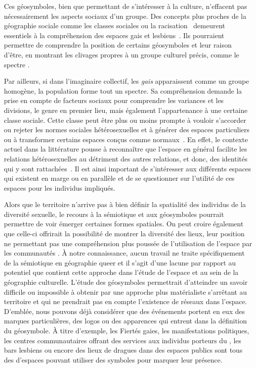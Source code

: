 Ces géosymboles, bien que permettant de s'intéresser à la culture, n'effacent pas nécessairement les aspects sociaux d'un groupe.
Des concepts plus proches de la géographie sociale comme les classes sociales ou la racisation~\citep{Bonniol2005} demeurent essentiels à la compréhension des espaces gais et lesbiens~\citep[93]{Oswin2008}.
Ils pourraient permettre de comprendre la position de certains géosymboles et leur raison d'être, en montrant les clivages propres à un groupe culturel précis, comme le spectre \lgbt{}.

Par ailleurs, si dans l'imaginaire collectif, les \emph{gais} apparaissent comme un groupe homogène, la population \lgbt{} forme tout un spectre.
Sa compréhension demande la prise en compte de facteurs sociaux pour comprendre les variances et les divisions, le genre en premier lieu, mais également l'appartenance à une certaine classe sociale.
Cette classe peut être plus ou moins prompte à vouloir s'accorder ou rejeter les normes sociales hétérosexuelles et à générer des espaces particuliers ou à transformer certains espaces conçus comme normaux~\citep{Lewis2011}.
En effet, le contexte actuel dans la littérature pousse à reconnaître que l'espace en général facilite les relations hétérosexuelles au détriment des autres relations, et donc, des identités qui y sont rattachées~\citep{Brown2003}.
Il est ainsi important de s'intéresser aux différents espaces qui existent en marge ou en parallèle et de se questionner sur l'utilité de ces espaces pour les individus impliqués.

Alors que le territoire n'arrive pas à bien définir la spatialité des individus de la diversité sexuelle, le recours à la sémiotique et aux géosymboles pourrait permettre de voir émerger certaines formes spatiales.
On peut croire également que celle-ci offrirait la possibilité de montrer la diversité des lieux, leur position ne permettant pas une compréhension plus poussée de l'utilisation de l'espace par les communautés \lgbt{}.
À notre connaissance, aucun travail ne traite spécifiquement de la sémiotique en géographie queer et il s'agit d'une lacune par rapport au potentiel que contient cette approche dans l'étude de l'espace et au sein de la géographie culturelle.
L'étude des géosymboles permettrait d'atteindre un savoir difficile ou impossible à obtenir par une approche plus matérialiste s'arrêtant au territoire et qui ne prendrait pas en compte l'existence de réseaux dans l'espace.
D'emblée, nous pouvons déjà considérer que des événements  portent en eux des marques particulières, des logos ou des apparences qui entrent dans la définition du géosymbole.
À titre d'exemple, les Fiertés gaies, les manifestations politiques, les centres communautaires offrant des services aux individus porteurs du \vih, les bars lesbiens ou encore des lieux de dragues dans des espaces publics sont tous des d'espaces \lgbt{} pouvant utiliser des symboles pour marquer leur présence.

